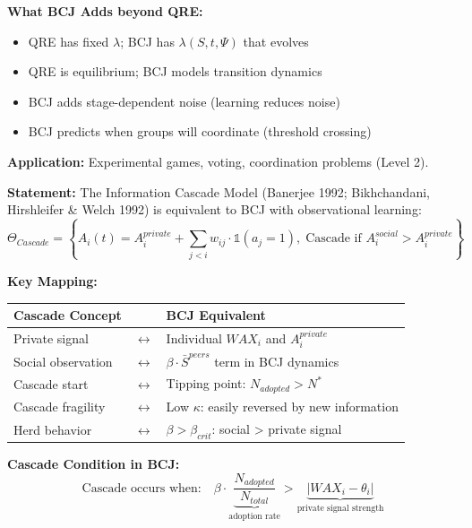 \begin{tcolorbox}[colback=green!5!white, colframe=green!75!black,
    title=Theorem BCJ-T28: Quantal Response Equilibrium (QRE) as Special Case]
\textbf{What BCJ Adds beyond QRE:}
\begin{itemize}[nosep]
\item QRE has fixed $\lambda$; BCJ has $\lambda(S, t, \Psi)$ that evolves
\item QRE is equilibrium; BCJ models transition dynamics
\item BCJ adds stage-dependent noise (learning reduces noise)
\item BCJ predicts when groups will coordinate (threshold crossing)
\end{itemize}

\textbf{Application:} Experimental games, voting, coordination problems (Level 2).
\end{tcolorbox}

\begin{tcolorbox}[colback=green!5!white, colframe=green!75!black,
    title=Theorem BCJ-T29: Social Learning / Information Cascades as Special Case]
\textbf{Statement:} The Information Cascade Model (Banerjee 1992; Bikhchandani, Hirshleifer \& Welch 1992) is equivalent to BCJ with observational learning:
\begin{equation}
\Theta_{Cascade} = \left\{A_i(t) = A_i^{private} + \sum_{j<i} w_{ij} \cdot \mathbb{1}(a_j = 1), \; \text{Cascade if } A_i^{social} > A_i^{private}\right\}
\end{equation}

\textbf{Key Mapping:}
\begin{center}
\begin{tabular}{lcl}
\toprule
\textbf{Cascade Concept} & & \textbf{BCJ Equivalent} \\
\midrule
Private signal & $\leftrightarrow$ & Individual $WAX_i$ and $A_i^{private}$ \\
Social observation & $\leftrightarrow$ & $\beta \cdot \bar{S}^{peers}$ term in BCJ dynamics \\
Cascade start & $\leftrightarrow$ & Tipping point: $N_{adopted} > N^*$ \\
Cascade fragility & $\leftrightarrow$ & Low $\kappa$: easily reversed by new information \\
Herd behavior & $\leftrightarrow$ & $\beta > \beta_{crit}$: social > private signal \\
\bottomrule
\end{tabular}
\end{center}

\textbf{Cascade Condition in BCJ:}
\begin{equation}
\text{Cascade occurs when:} \quad \beta \cdot \underbrace{\frac{N_{adopted}}{N_{total}}}_{\text{adoption rate}} > \underbrace{|WAX_i - \theta_i|}_{\text{private signal strength}}
\end{equation}


\end{tcolorbox}
